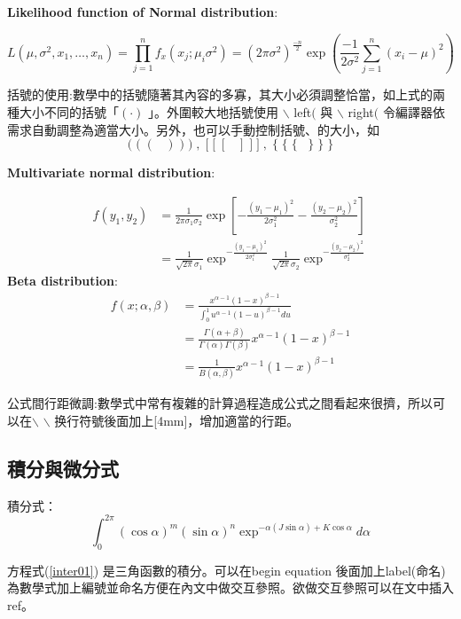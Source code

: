   \textbf{Likelihood function of Normal distribution}: 
  
  $$
  L(\mu,\sigma^{2},x_1,\ldots,x_n)=\prod_{j=1}^{n}f_x(x_j;\mu_i\sigma^{2})=(2\pi\sigma^{2})^{\frac{-n}{2}}\exp\left(\frac{-1}{2\sigma^{2}}\sum_{j=1}^{n}(x_i-\mu)^{2}\right)
  $$
\bigskip

括號的使用:數學中的括號隨著其內容的多寡，其大小必須調整恰當，如上式的兩種大小不同的括號「$( \cdot)$ 」。外圍較大地括號使用 $\backslash$  left$($ 與 $\backslash$  right$($ 令編譯器依需求自動調整為適當大小。另外，也可以手動控制括號、的大小，如
$$ \bigg(\; \big( \;(\;\;\;) \;\big) \;\bigg) \;,\; \bigg[ \;\big[ \;[\;\;\;]\; \big]\; \bigg]\;,\; \bigg\{ \;\big\{ \;\{\;\;\;\} \;\big\} \;\bigg\}$$ 
 
 \bigskip
 
  \textbf{Multivariate normal distribution}: 
  
$$
\begin{aligned}
f(y_1,y_2)&= \frac{1}{2\pi\sigma_1\sigma_2}\exp\left[-\frac{(y_1-\mu_1)^{2}}{2\sigma_1^{2}}-\frac{(y_2-\mu_2)^{2}}{\sigma_2^{2}}\right]\\[4mm]
&= \frac{1}{\sqrt{2\pi}\sigma_1}\exp^{\displaystyle-\frac{(y_1-\mu_1)^{2}}{2\sigma_1^{2}}}\frac{1}{\sqrt{2\pi}\sigma_2}\exp^{\displaystyle-\frac{(y_2-\mu_2)^{2}}{\sigma_2^{2}}}
\end{aligned}
$$
\textbf{Beta distribution}: 
$$
\begin{aligned}
f(x;\alpha,\beta)&=\frac{x^{\alpha-1}(1-x)^{\beta-1}}{\int^1_0u^{\alpha-1}(1-u)^{\beta-1}du}\\[4mm]
&=\frac{\Gamma(\alpha+\beta)}{\Gamma(\alpha)\Gamma(\beta)}x^{\alpha-1}(1-x)^{\beta-1}\\[4mm]
&=\frac{1}{B(\alpha,\beta)}x^{\alpha-1}(1-x)^{\beta-1}
\end{aligned}
$$

公式間行距微調:數學式中常有複雜的計算過程造成公式之間看起來很擠，所以可以在$\backslash$ $\backslash$ 换行符號後面加上[4mm]，增加適當的行距。
 

\subsection{積分與微分式}
積分式：
\begin{equation}\label{inter01}
 \int^{2\pi}_0(\cos\alpha)^{m}(\sin\alpha)^{n}\exp^{-\alpha(J\sin\alpha)+K\cos\alpha}d\alpha
\end{equation}

方程式(\ref{inter01}) 是三角函數的積分。可以在begin equation 後面加上label(命名)為數學式加上編號並命名方便在內文中做交互參照。欲做交互參照可以在文中插入ref。 


